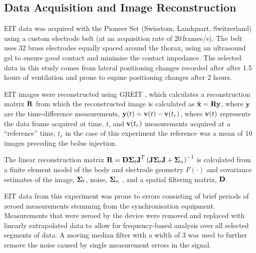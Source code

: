 \subsection{Data Acquisition and Image Reconstruction}

EIT data was acquired with the Pioneer Set (Swisstom, Landquart, Switzerland)
using a custom electrode belt (at an acquisition rate of 20\,frames/s).
The belt uses 32 brass electrodes equally spaced around the thorax, 
using an ultrasound gel to ensure good contact and minimise the contact impedance. 
The selected data in this study comes from lateral positioning changes recorded after
after 1.5 hours of ventilation and prone to supine positioning changes after 
2 hours.

EIT images were 
reconstructed using GREIT \parencite{adler_greit_2009}, %
which
calculates a reconstruction matrix $\mathbf{R}$ from which
the reconstructed image is calculated as $\hat{\mathbf{x}} = \mathbf{R} \mathbf{y}$,
where $\mathbf{y}$ are the time-difference
measurements,
$\mathbf{y}(t) = {\mbox{\bf v}}(t) - {\mbox{\bf v}}(t_r)$,
where ${\mbox{\bf v}}(t)$ represents 
the data frame acquired at time, $t$,
and ${\mbox{\bf v}}(t_r)$ measurements acquired at a 
``reference'' time, $t_r$ 
in the case of this experiment the reference was
a mean of 10 images preceding the bolus injection.

The linear reconstruction matrix $\mathbf{R}
 = \mathbf{D} \boldsymbol{\Sigma}_t {\mbox{\bf J}}^T 
    \left(
       {\mbox{\bf J}} \boldsymbol{\Sigma}_t {\mbox{\bf J}} + \boldsymbol{\Sigma}_n
    \right)^{-1}
$ is calculated from a
finite element model of the body and electrode geometry
$F(\cdot)$ and covariance estimates of the image, $\boldsymbol{\Sigma}_t$, 
noise, $\boldsymbol{\Sigma}_n$ \parencite{grychtol_3d_2016}, %
and
a spatial filtering matrix, $\mathbf{D}$.

EIT data from this experiment was prone to errors consisting of brief 
periods of zeroed measurements stemming 
from the synchronisation equipment. 
Measurements that were zeroed by the device were removed and replaced with linearly  
extrapolated data to allow for frequency-based analysis over all selected segments
of data.
A moving median filter with a width of 3 was used to further remove the
noise caused by single measurement errors in the signal.

%

